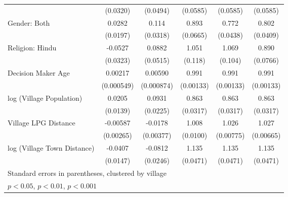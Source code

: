 {\begin{tabular}{l*{5}{c}}
                    &    (0.0320)         &    (0.0494)          &    (0.0585)         &    (0.0585)         &    (0.0585)         \\
[1em]
Gender: Both          &      0.0282         &       0.114\sym{***}&       0.893         &       0.772\sym{***}&       0.802\sym{***}\\
                    &    (0.0197)         &    (0.0318)        &    (0.0665)         &    (0.0438)         &    (0.0409)         \\
[1em]
Religion: Hindu        &     -0.0527         &      0.0882         &       1.051         &       1.069         &       0.890         \\
                    &    (0.0323)         &    (0.0515)         &     (0.118)         &     (0.104)         &    (0.0766)         \\
[1em]
Decision Maker Age           &     0.00217\sym{***}&     0.00590\sym{***}&       0.991\sym{***}&       0.991\sym{***}&       0.991\sym{***}\\
                    &  (0.000549)         &  (0.000874)         &   (0.00133)         &   (0.00133)         &   (0.00133)         \\
[1em]
log (Village Population)      &      0.0205         &      0.0931\sym{***}&       0.863\sym{***}&       0.863\sym{***}&       0.863\sym{***}\\
                    &    (0.0139)         &    (0.0225)         &    (0.0317)         &    (0.0317)         &    (0.0317)         \\
[1em]
Village LPG Distance &    -0.00587\sym{*}  &     -0.0178\sym{***}&       1.008         &       1.026\sym{***}&       1.027\sym{***}\\
                    &   (0.00265)         &   (0.00377)         &    (0.0100)         &   (0.00775)         &   (0.00665)         \\
[1em]
log (Village Town Distance) &     -0.0407\sym{**} &     -0.0812\sym{***}&       1.135\sym{**} &       1.135\sym{**} &       1.135\sym{**} \\
                    &    (0.0147)         &    (0.0246)         &    (0.0471)         &    (0.0471)         &    (0.0471)         \\
[1em]
\hline\hline
\multicolumn{6}{l}{\footnotesize Standard errors in parentheses, clustered by village}\\
\multicolumn{6}{l}{\footnotesize \sym{*} \(p<0.05\), \sym{**} \(p<0.01\), \sym{***} \(p<0.001\)}\\
\end{tabular}%
}